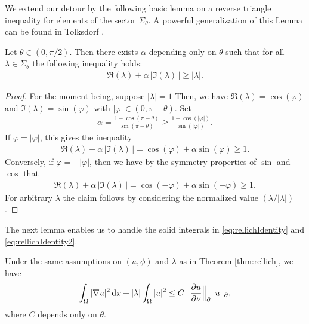We extend our detour by the following basic lemma on a reverse triangle inequality for elements of the sector $\Sigma_\theta$.
A powerful generalization of this Lemma can be found in Tolksdorf \cite[Lem. 5.2.4]{tolksdorf}.

\begin{lem}
  \label{lem:lambdaIneq}
  Let $\theta \in (0,\pi/2)$.
  Then there exists $\alpha$ depending only on $\theta$ such that for all $\lambda \in \Sigma_\theta$ the following inequality holds:
  \begin{align*}
    \Re(\lambda) + \alpha \, \big|\Im(\lambda)\,\big| \geq |\lambda|.
  \end{align*}
\end{lem}

\begin{proof}
  For the moment being, suppose $|\lambda| = 1$ Then, we have $\Re(\lambda) = \cos(\varphi)$ and $\Im(\lambda) = \sin(\varphi)$ with $|\varphi| \in (0, \pi - \theta)$. 
  Set
  \begin{align*}
    \alpha = \frac{1 - \cos(\pi - \theta)}{\sin(\pi - \theta)} \geq \frac{1 - \cos(|\varphi|)}{\sin(|\varphi|)}.
  \end{align*}
  If $\varphi = |\varphi|$, this gives the inequality
  \begin{align*}
    \Re(\lambda) + \alpha \, |\Im(\lambda)\,| = \cos(\varphi) + \alpha \sin(\varphi) \geq 1.
  \end{align*}
  Conversely, if $\varphi = -|\varphi|$, then we have by the symmetry properties of $\sin$ and $\cos$ that
  \begin{align*}
    \Re(\lambda) + \alpha\, |\Im(\lambda)\,| = \cos(-\varphi) + \alpha \sin(-\varphi) \geq 1.
  \end{align*}
  For arbitrary $\lambda$ the claim follows by considering the normalized value $(\lambda / |\lambda|)$.
\end{proof}

The next lemma enables us to handle the solid integrals in \eqref{eq:rellichIdentity} and \eqref{eq:rellichIdentity2}.

\begin{lem}
  \label{lem:laxMilgramIneq}
  Under the same assumptions on $(u,\phi)$ and $\lambda$ as in Theorem \ref{thm:rellich}, we have
  \begin{align}
    \label{eq:laxMilgramIneq}
    \int_\Omega |\nabla u|^2 \, {\operatorname{d}\!{x}} + |\lambda| \int_\Omega |u|^2 \leq C \,\Big\| \frac{\partial u}{\partial \nu} \Big\|_\partial  \|u\|_\partial,
  \end{align}
  where $C$ depends only on $\theta$.
\end{lem}

